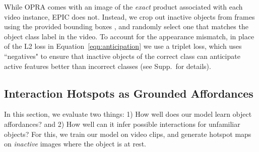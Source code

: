 \documentclass[10pt,twocolumn,letterpaper]{article}
\newcommand{\refeqn}[1]{Equation~\ref{#1}}
\begin{document}
While OPRA comes with an image  of the \emph{exact} product associated with each video instance, EPIC does not. Instead, we crop out inactive objects from frames using the provided bounding boxes , and randomly select one that matches the object class label in the video. To account for the appearance mismatch, in place of the L2 loss in \refeqn{eqn:anticipation} we use a triplet loss,
which uses ``negatives" to ensure that inactive objects of the correct class can anticipate active features better than incorrect classes (see Supp.~for details).












\subsection{Interaction Hotspots as Grounded Affordances} \label{sec:grounded-affordances}

In this section, we evaluate two things: 1) How well does our model learn object affordances? and 2) How well can it infer possible interactions for unfamiliar objects? For this, we train our model on video clips, and generate hotspot maps on \emph{inactive} images where the object is at rest.
\end{document}

